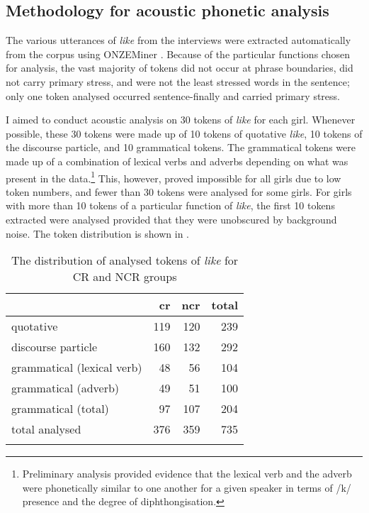 \subsection{Methodology for acoustic phonetic analysis}\label{sec:phoneticmethod}


The various utterances of \textit{like} from the interviews were extracted automatically from the corpus using ONZEMiner \citep{onzeminer}. Because of the particular functions chosen for analysis, the vast majority of tokens did not occur at phrase boundaries, did not carry primary stress, and were not the least stressed words in the sentence; only one token analysed occurred sentence-finally and carried primary stress. 

I aimed to conduct acoustic analysis on 30 tokens of \textit{like} for each girl. Whenever possible, these 30 tokens were made up of 10 tokens of quotative \textit{like}, 10 tokens of the discourse particle, and 10 grammatical tokens. The grammatical tokens were made up of a combination of lexical verbs and adverbs depending on what was present in the data.\footnote{Preliminary analysis provided evidence that the lexical verb and the adverb were phonetically similar to one another for a given speaker in terms of /k/ presence and the degree of diphthongisation.} This, however, proved impossible for all girls due to low token numbers, and fewer than 30 tokens were analysed for some girls. For girls with more than 10 tokens of a particular function of \textit{like}, the first 10 tokens extracted were analysed provided that they were unobscured by background noise. The token distribution is shown in .

 

        
\begin{table}[t]
\caption{The distribution of analysed tokens of \textit{like} for CR and NCR groups}
  \label{tab:tokensanalysed}
	 \begin{center}
		\begin{tabular}{lrrr}\lsptoprule
	
		& \sc cr 	&	 \sc ncr & \sc total \\
              
  \midrule
  
quotative & 119 & 120 & 239 \\
discourse particle & 160 & 132 & 292 \\
grammatical (lexical verb) & 48 & 56 & 104\\
grammatical (adverb) & 49  & 51 & 100 \\
grammatical (total) & 97 & 107 & 204 \\
total analysed      & 376 & 359 & 735 \\

\lspbottomrule
		\end{tabular}
	
	\end{center}
\end{table}


